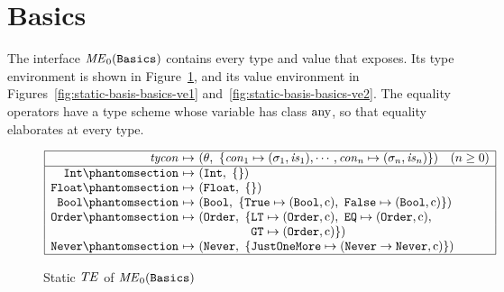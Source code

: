 \section{Basics}\label{sec:appendix-static-basis-basics}

The interface $\mathit{ME}_0(\textnormal{\texttt{Basics}})$ contains every type and value that
 exposes. Its type environment is shown in
Figure~\ref{fig:static-basis-basics-te}, and its value environment in
Figures~\ref{fig:static-basis-basics-ve1} and~\ref{fig:static-basis-basics-ve2}.
The equality operators have a type scheme whose variable has class $\mathrm{any}$, so
that equality elaborates at every type. %

\begin{figure}[htbp]
\centering
\small
\[
\begin{array}{|r@{\ }c@{\ }l|}
\hline
\tycon & \mapsto & (\theta,\ \{\con_1 \mapsto (\sigma_1, \is_1), \cdots, \con_n \mapsto (\sigma_n, \is_n)\})\quad (n \ge 0)\\
\hline
\kw{Int}\citelabel{b:Basics.Int} & \mapsto & (\tInt,\ \emptymap)\\
\kw{Float}\citelabel{b:Basics.Float} & \mapsto & (\tFloat,\ \emptymap)\\
\kw{Bool}\citelabel{b:Basics.Bool} & \mapsto & (\tBool,\ \{\kw{True} \mapsto (\tBool, \isc),\ \kw{False} \mapsto (\tBool, \isc)\})\\
\kw{Order}\citelabel{b:Basics.Order} & \mapsto & (\sbtOrder,\ \{\kw{LT} \mapsto (\sbtOrder, \isc),\ \kw{EQ} \mapsto (\sbtOrder, \isc),\\
 & & \phantom{(\sbtOrder,\ \{}\kw{GT} \mapsto (\sbtOrder, \isc)\})\\
\kw{Never}\citelabel{b:Basics.Never} & \mapsto & (\sbtNever,\ \{\kw{JustOneMore} \mapsto (\sbtNever \rightarrow \sbtNever, \isc)\})\\
\hline
\end{array}
\]
\caption{Static $\mathit{TE}$ of $\mathit{ME}_0(\textnormal{\texttt{Basics}})$}\label{fig:static-basis-basics-te}
\end{figure}

